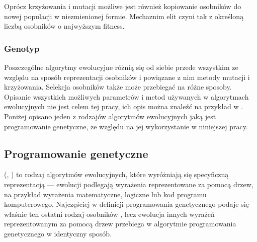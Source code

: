 Oprócz krzyżowania i mutacji możliwe jest również kopiowanie osobników do nowej populacji w niezmienionej formie. Mechaznim elit czyni tak z określoną liczbą osobników o najwyższym fitness.

\subsubsection{Genotyp}
Poszczególne algorytmy ewolucyjne różnią się od siebie przede wszystkim ze względu na sposób reprezentacji osobników i powiązane z nim metody mutacji i krzyżowania. Selekcja osobników także może przebiegać na różne sposoby. Opisanie wszystkich możliwych parametrów i metod używanych w algorytmach ewolucyjnych nie jest celem tej pracy, ich opis można znaleźć na przykład w \cite{Luke2009Metaheuristics}. Poniżej opisano jeden z rodzajów algorytmów ewolucyjnych jaką jest programowanie genetyczne, ze względu na jej wykorzystanie w niniejszej pracy.


\subsection{Programowanie genetyczne}

 (, ) to rodzaj algorytmów ewolucyjnych, które wyróżniają się specyficzną reprezentacją --- ewolucji podlegają wyrażenia reprezentowane za pomocą drzew, na przykład wyrażenia matematyczne, logiczne lub kod programu komputerowego. Najczęściej w definicji programowania genetycznego podaje się właśnie ten ostatni rodzaj osobników \cite{Luke2009Metaheuristics} \cite{Poli:2008:FGG:1796422}, lecz ewolucja innych wyrażeń reprezentowanym za pomocą drzew przebiega w algorytmie programowania genetycznego w identyczny sposób.

